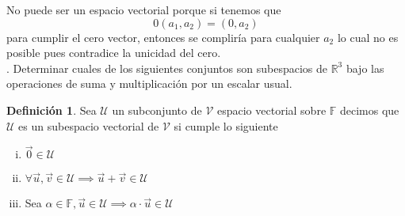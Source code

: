 \documentclass[letterpaper]{article}
\newcommand{\F}{\mathds{F}}
\renewcommand{\*}{\cdot}
\theoremstyle{definition}
\newtheorem{definition}{Definición}
\begin{document}
No puede ser un espacio vectorial porque si tenemos que \[ 0(a_1, a_2) = (0, a_2)  \] para cumplir el cero vector, entonces se compliría para cualquier $a_2$ lo cual no es posible pues contradice la unicidad del cero.\\

. Determinar cuales de los siguientes conjuntos son subespacios de $\mathbb{R}^{3}$ bajo las operaciones de suma y multiplicación por un escalar usual.\\
\begin{definition}
	Sea $ \mathcal{U} $ un subconjunto de $ \mathcal{V}$ espacio vectorial sobre $ \F $ decimos que $ \mathcal{U} $ es un subespacio vectorial de $ \mathcal{V} $ si cumple lo siguiente
	
	\begin{enumerate}[i)]
		\item $ \vec{0}  \in \mathcal{U} $
		\item $ \forall \vec{u}, \vec{v} \in \mathcal{U} \implies \vec{u} + \vec{v} \in \mathcal{U} $
		\item Sea $ \alpha \in \F, \vec{u} \in \mathcal{U} \implies \alpha \* \vec{u} \in \mathcal{U} $
	\end{enumerate}
	   
\end{definition}
\end{document}
